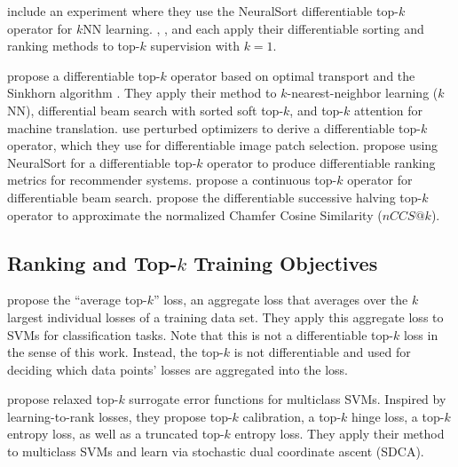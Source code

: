 \documentclass{article}
\begin{document}
\citet{Grover2019-NeuralSort} include an experiment where they use the NeuralSort differentiable top-$k$ operator for $k$NN learning.
\citet{Cuturi2019-SortingOT}, \citet{Blondel2020-FastSorting}, and \citet{Petersen2021-diffsort} each apply their differentiable sorting and ranking methods to top-$k$ supervision with $k=1$.

\citet{xie2020differentiable} propose a differentiable top-$k$ operator based on optimal transport and the Sinkhorn algorithm \citep{Cuturi13Sinkhorn}.
They apply their method to $k$-nearest-neighbor learning ($k$NN), differential beam search with sorted soft top-$k$, and top-$k$ attention for machine translation.
\citet{cordonnier2021differentiable} use perturbed optimizers \citep{Berthet2020-PerturbedOptimizers} to derive a differentiable top-$k$ operator, which they use for differentiable image patch selection.
\citet{lee2021differentiable} propose using NeuralSort for a differentiable top-$k$ operator to produce differentiable ranking metrics for recommender systems.
\citet{goyal2018continuous} propose a continuous top-$k$ operator for differentiable beam search.
\citet{pietruszka2020successive} propose the differentiable successive halving top-$k$ operator to approximate the normalized Chamfer Cosine Similarity ($nCCS@k$).



\subsection{Ranking and Top-$k$ Training Objectives}




\citet{fan2017learning} propose the ``average top-$k$'' loss, an aggregate loss that averages over the $k$ largest individual losses of a training data set.
They apply this aggregate loss to SVMs for classification tasks.
Note that this is not a differentiable top-$k$ loss in the sense of this work. 
Instead, the top-$k$ is not differentiable and used for deciding which data points' losses are aggregated into the loss.

\citet{lapin2015top,lapin2016loss} propose relaxed top-$k$ surrogate error functions for multiclass SVMs.
Inspired by learning-to-rank losses, they propose top-$k$ calibration, a top-$k$ hinge loss, a top-$k$ entropy loss, as well as a truncated top-$k$ entropy loss.
They apply their method to multiclass SVMs and learn via stochastic dual coordinate ascent (SDCA).
\end{document}
